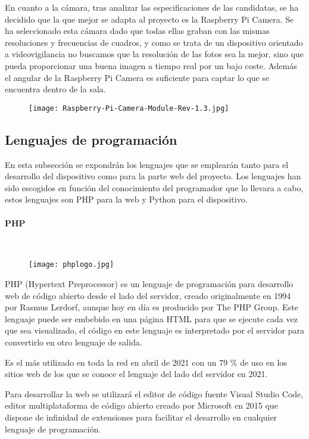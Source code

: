 En cuanto a la cámara, tras analizar las especificaciones de las candidatas, se ha decidido que la que mejor se adapta al proyecto es la Raspberry Pi Camera. Se ha seleccionado esta cámara dado que todas ellas graban con las mismas resoluciones y frecuencias de cuadros, y como se trata de un dispositivo orientado a videovigilancia no buscamos que la resolución de las fotos sea la mejor, sino que pueda proporcionar una buena imagen a tiempo real por un bajo coste. Además el angular de la Raspberry Pi Camera es suficiente para captar lo que se encuentra dentro de la sala.
\begin{figure}[H]
	{\texttt{[image: Raspberry-Pi-Camera-Module-Rev-1.3.jpg]}}
\end{figure}

\subsection{Lenguajes de programación}
En esta subsección se expondrán los lenguajes que se emplearán tanto para el desarrollo del dispositivo como para la parte web del proyecto. Los lenguajes han sido escogidos en función del conocimiento del programador que lo llevara a cabo, estos lenguajes son PHP para la web y Python para el dispositivo.

\paragraph{PHP}\mbox{} \\
\begin{figure}[H]
	{\texttt{[image: phplogo.jpg]}}
\end{figure}
PHP (Hypertext Preprocessor)\cite{welling_php_2003} es un lenguaje de programación para desarrollo web de código abierto desde el lado del servidor, creado originalmente en 1994 por Rasmus Lerdorf, aunque hoy en día es producido por The PHP Group. Este lenguaje puede ser embebido en una página HTML para que se ejecute cada vez que sea visualizado, el código en este lenguaje es interpretado por el servidor para convertirlo en otro lenguaje de salida.

Es el más utilizado en toda la red en abril de 2021 \cite{noauthor_usage_nodate} con un 79 \% de uso en los sitios web de los que se conoce el lenguaje del lado del servidor en 2021.

Para desarrollar la web se utilizará el editor de código fuente Visual Studio Code, editor multiplataforma de código abierto creado por Microsoft en 2015 \cite{noauthor_visual_2021} que dispone de infinidad de extensiones para facilitar el desarrollo en cualquier lenguaje de programación.

